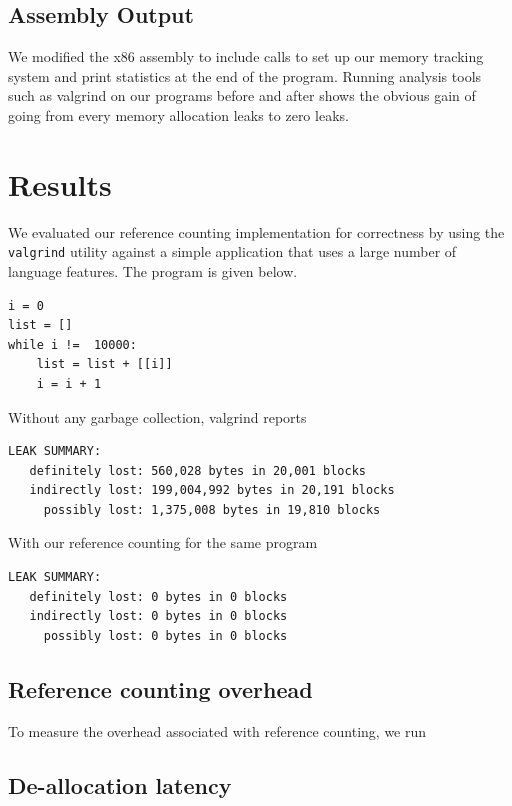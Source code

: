 \documentclass{sigplanconf}
\begin{document}
\subsection{Assembly Output}
We modified the x86 assembly to include calls to set up our memory tracking system and print statistics at the end of the program.  Running analysis tools such as valgrind on our programs before and after shows the obvious gain of going from every memory allocation leaks to zero leaks.

\section{Results}
\label{sec:results}

We evaluated our reference counting implementation for correctness by using the \texttt{valgrind} utility against a simple application that uses a large number of language features.  The program is given below.

\begin{verbatim}
i = 0
list = []
while i !=  10000:
    list = list + [[i]]
    i = i + 1
\end{verbatim}

Without any garbage collection, valgrind reports 

\footnotesize
\begin{verbatim}
LEAK SUMMARY:
   definitely lost: 560,028 bytes in 20,001 blocks
   indirectly lost: 199,004,992 bytes in 20,191 blocks
     possibly lost: 1,375,008 bytes in 19,810 blocks
\end{verbatim}
\normalsize

With our reference counting for the same program

\footnotesize
\begin{verbatim}
LEAK SUMMARY:
   definitely lost: 0 bytes in 0 blocks
   indirectly lost: 0 bytes in 0 blocks
     possibly lost: 0 bytes in 0 blocks
\end{verbatim}
\normalsize


\subsection{Reference counting overhead}

To measure the overhead associated with reference counting, we run 

\subsection{De-allocation latency}
\end{document}
